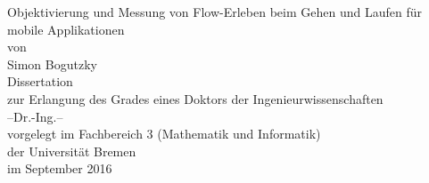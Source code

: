 \begin{titlepage}
\begin{singlespace}
\begin{center}
\Huge Objektivierung und Messung von Flow-Erleben beim Gehen und Laufen für mobile Applikationen\\
\vspace{15mm}
\normalsize von\\
\normalsize Simon Bogutzky\\
\vspace{30mm}
\normalsize Dissertation\\
\normalsize zur Erlangung des Grades eines Doktors der Ingenieurwissenschaften\\
\normalsize  --Dr.-Ing.--\\
\vspace{80mm}
\normalsize vorgelegt im Fachbereich 3 (Mathematik und Informatik)\\
\normalsize der Universität Bremen\\
\normalsize im September 2016\\
\end{center}
\end{singlespace}
\end{titlepage}